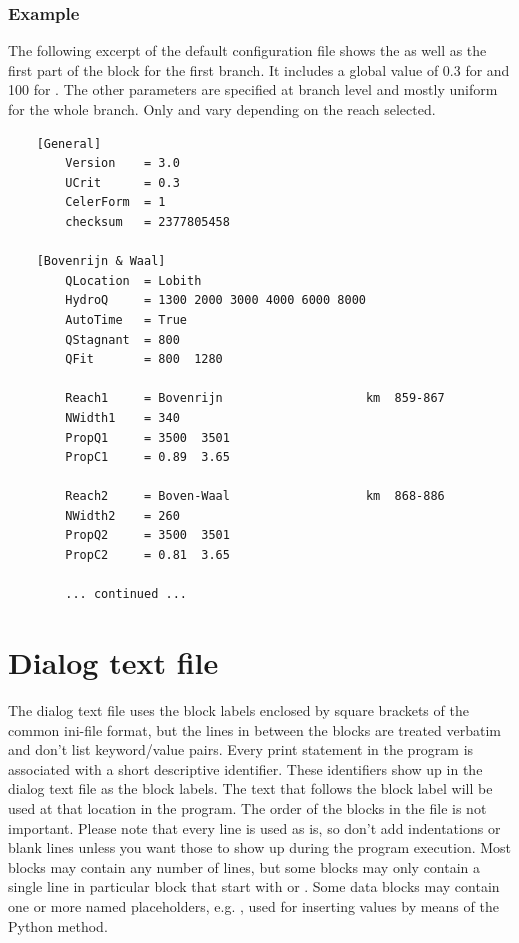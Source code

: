 \subsubsection*{Example}

The following excerpt of the default  configuration file shows the \keyw{[General]} as well as the first part of the  block for the first branch.
It includes a global value of 0.3 for  and 100 for .
The other parameters are specified at branch level and mostly uniform for the whole branch.
Only  and  vary depending on the reach selected.

\begin{Verbatim}
    [General]
        Version    = 3.0
        UCrit      = 0.3
        CelerForm  = 1
        checksum   = 2377805458
    
    [Bovenrijn & Waal]
        QLocation  = Lobith
        HydroQ     = 1300 2000 3000 4000 6000 8000
        AutoTime   = True
        QStagnant  = 800
        QFit       = 800  1280
    
        Reach1     = Bovenrijn                    km  859-867
        NWidth1    = 340
        PropQ1     = 3500  3501
        PropC1     = 0.89  3.65
    
        Reach2     = Boven-Waal                   km  868-886
        NWidth2    = 260
        PropQ2     = 3500  3501
        PropC2     = 0.81  3.65

        ... continued ...
\end{Verbatim}

\section{Dialog text file}

The dialog text file uses the block labels enclosed by square brackets of the common ini-file format, but the lines in between the blocks are treated verbatim and don't list keyword/value pairs.
Every print statement in the program is associated with a short descriptive identifier.
These identifiers show up in the dialog text file as the block labels.
The text that follows the block label will be used at that location in the program.
The order of the blocks in the file is not important.
Please note that every line is used as is, so don't add indentations or blank lines unless you want those to show up during the program execution.
Most blocks may contain any number of lines, but some blocks may only contain a single line in particular block that start with  or .
Some data blocks may contain one or more named placeholders, e.g. , used for inserting values by means of the Python  method.

